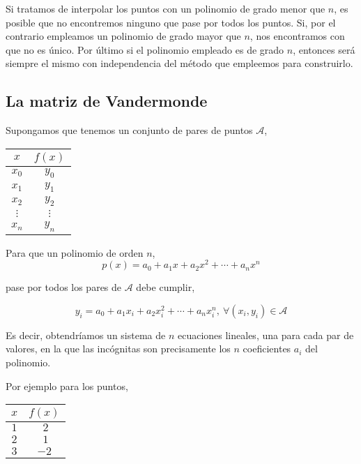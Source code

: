 Si tratamos de interpolar los puntos con un polinomio de grado menor que $n$, es posible que no encontremos ninguno que pase por todos los puntos. Si, por el contrario empleamos un polinomio de grado mayor que $n$, nos encontramos con que no es único. Por último si el polinomio empleado es de grado $n$, entonces será siempre el mismo con independencia del método que empleemos para construirlo.

\subsection{La matriz de Vandermonde} 
Supongamos que tenemos un conjunto de pares de puntos $\mathcal{A}$, 
\begin{table}[h]
\centering
\begin{tabular}{c|c}
$x$&$f(x)$\\ 
\hline
$x_0$& $y_0$\\
$x_1$&$y_1$\\
$x_2$&$y_2$\\
$\vdots$&$\vdots$\\
$x_n$&$y_n$
\end{tabular}
\label{tpuntos3}
\end{table}

Para que un polinomio de orden $n$,
\begin{equation*}
p(x)=a_0+a_1x+a_2x^2+\cdots+a_nx^n
\end{equation*}

pase por todos los pares de $\mathcal{A}$ debe cumplir,

\begin{equation*}
y_i=a_0+a_1x_i+a_2x_i^2+\cdots+a_nx_i^n, \ \forall (x_i,y_i) \in \mathcal{A}
\end{equation*}

Es decir, obtendríamos un sistema de $n$ ecuaciones lineales, una para cada par de valores, en la que las incógnitas son precisamente los $n$ coeficientes $a_i$ del polinomio.

Por ejemplo para los puntos,

\begin{table}[h]
\centering 
\begin{tabular}{c|c}
$x$&$f(x)$\\ 
\hline
$1$&$\ 2$\\
$2$&$ \ 1$\\
$3$&$-2$
\end{tabular}
\label{tpuntos4}
\end{table}

